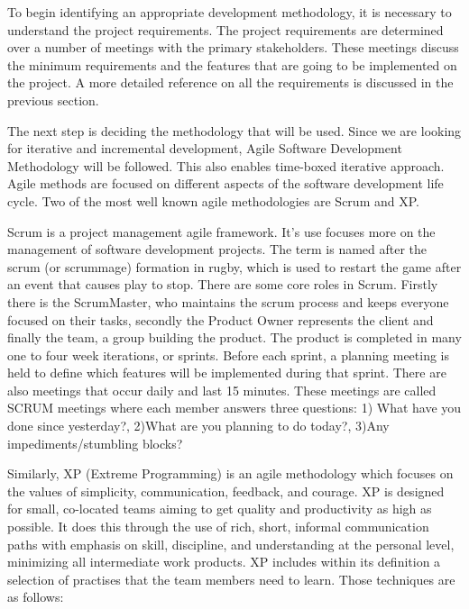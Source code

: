 To begin identifying an appropriate development methodology, it is necessary to understand the project requirements. The project requirements are determined over a number of meetings with the primary stakeholders. These meetings discuss the minimum requirements and the features that are going to be implemented on the project. A more detailed reference on all the requirements is discussed in the previous section.

The next step is deciding the methodology that will be used. Since we are looking for iterative and incremental development, Agile Software Development Methodology will be followed. This also enables time-boxed iterative approach. Agile methods are focused on different aspects of the software development life cycle. Two of the most well known agile methodologies are Scrum and XP.

Scrum is a project management agile framework. It's use focuses more on the management of software development projects. The term is named after the scrum (or scrummage) formation in rugby, which is used to restart the game after an event that causes play to stop. There are some core roles in Scrum. Firstly there is the ScrumMaster, who maintains the scrum process and keeps everyone focused on their tasks, secondly the Product Owner represents the client and finally the team, a group building the product. The product is completed in many one to four week iterations, or sprints. Before each sprint, a planning meeting is held to define which features will be implemented during that sprint. There are also meetings that occur daily and last 15 minutes. These meetings are called SCRUM meetings where each member answers three questions: 1) What have you done since yesterday?, 2)What are you planning to do today?, 3)Any impediments/stumbling blocks?

Similarly, XP (Extreme Programming) is an agile methodology which focuses on the values of simplicity, communication, feedback, and courage. XP is designed for small, co-located teams aiming to get quality and productivity as high as possible. It does this through the use of rich, short, informal communication paths with emphasis on skill, discipline, and understanding at the personal level, minimizing all intermediate work products. XP includes within its definition a selection of practises that the team members need to learn. Those techniques are as follows:

